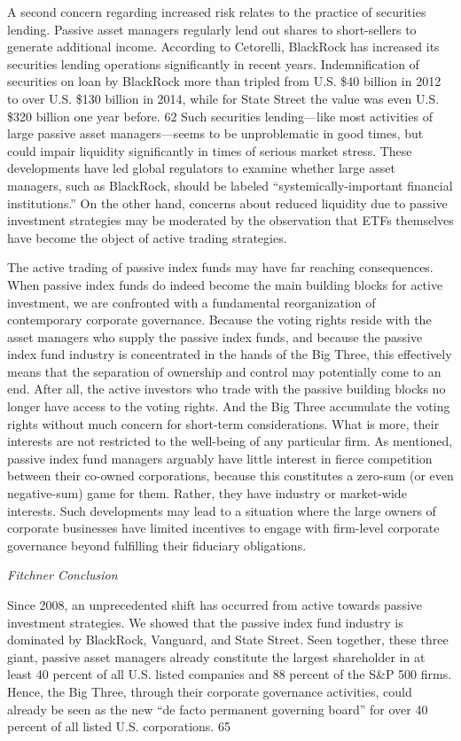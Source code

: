 \documentclass[
]{book}
\begin{document}
A second concern regarding increased risk relates to the practice of securities lending. Passive asset managers regularly lend out shares to short-sellers to generate additional income. According to Cetorelli, BlackRock has increased its securities lending operations significantly in recent years. Indemnification of securities on loan by BlackRock more than tripled from U.S. \$40 billion in 2012 to over U.S. \$130 billion in 2014, while for State Street the value was even U.S. \$320 billion one year before. 62 Such securities lending---like most activities of large passive asset managers---seems to be unproblematic in good times, but could impair liquidity significantly in times of serious market stress. These developments have led global regulators to examine whether large asset managers, such as BlackRock, should be labeled ``systemically-important financial institutions.''
On the other hand, concerns about reduced liquidity due to passive investment strategies may be moderated by the observation that ETFs themselves have become the object of active trading strategies.

The active trading of passive index funds may have far reaching consequences. When passive index funds do indeed become the main building blocks for active investment, we are confronted with a fundamental reorganization of contemporary corporate governance. Because the voting rights reside with the asset managers who supply the passive index funds, and because the passive index fund industry is concentrated in the hands of the Big Three, this effectively means that the separation of ownership and control may potentially come to an end. After all, the active investors who trade with the passive building blocks no longer have access to the voting rights. And the Big Three accumulate the voting rights without much concern for short-term considerations. What is more, their interests are not restricted to the well-being of any particular firm. As mentioned, passive index fund managers arguably have little interest in fierce competition between their co-owned corporations, because this constitutes a zero-sum (or even negative-sum) game for them. Rather, they have industry or market-wide interests. Such developments may lead to a situation where the large owners of corporate businesses have limited incentives to engage with firm-level corporate governance beyond fulfilling their fiduciary obligations.

\emph{Fitchner Conclusion}

Since 2008, an unprecedented shift has occurred from active towards passive investment strategies. We showed that the passive index fund industry is dominated by BlackRock, Vanguard, and State Street. Seen together, these three giant, passive asset managers already constitute the largest shareholder in at least 40 percent of all U.S. listed companies and 88 percent of the S\&P 500 firms. Hence, the Big Three, through their corporate governance activities, could already be seen as the new ``de facto permanent governing board'' for over 40 percent of all listed U.S. corporations. 65
\end{document}
